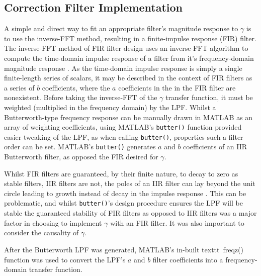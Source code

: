 \documentclass{report}
\begin{document}
        \subsection{Correction Filter Implementation}
            A simple and direct way to fit an appropriate filter's magnitude response to $\gamma$ is to use the inverse-FFT method, resulting in a finite-impulse response (FIR) filter.
            The inverse-FFT method of FIR filter design uses an inverse-FFT algorithm to compute the time-domain impulse response of a filter from it's frequency-domain magnitude response \cite{li2019digital}.
            As the time-domain impulse response is simply a single finite-length series of scalars, it may be described in the context of FIR filters as a series of $b$ coefficients, where the $a$ coefficients in the in the FIR filter are nonexistent.
            Before taking the inverse-FFT of the $\gamma$ transfer function, it must be weighted (multiplied in the frequency domain) by the LPF.
            Whilst a Butterworth-type frequency response can be manually drawn in MATLAB as an array of weighting coefficients, using MATLAB's \texttt{butter()} function provided easier tweaking of the LPF, as when calling \texttt{butter()}, properties such a filter order can be set.
            MATLAB's \texttt{butter()} generates $a$ and $b$ coefficients of an IIR Butterworth filter, as opposed the FIR desired for $\gamma$.

            Whilst FIR filters are guaranteed, by their finite nature, to decay to zero as stable filters, IIR filters are not, the poles of an IIR filter can lay beyond the unit circle leading to growth instead of decay in the impulse response \cite{litwin2000fir}.
            This can be problematic, and whilst \texttt{butter()}'s design procedure ensures the LPF will be stable the guaranteed stability of FIR filters as opposed to IIR filters was a major factor in choosing to implement $\gamma$ with an FIR filter. 
            It was also important to consider the causality of $\gamma$.

            After the Butterworth LPF was generated, MATLAB's in-built texttt\ {freqz()} function was used to convert the LPF's $a$ and $b$ filter coefficients into a frequency-domain transfer function.
\end{document}
